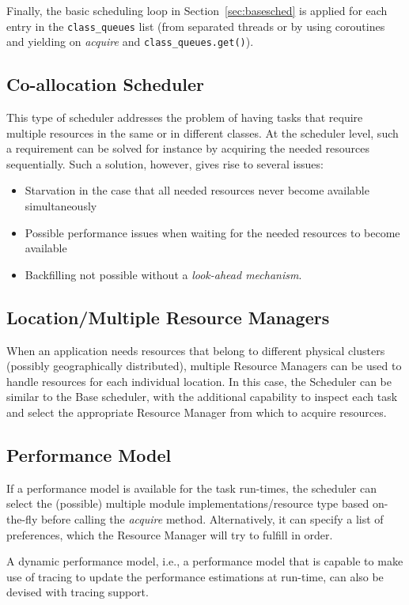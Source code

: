 \documentclass[10pt]{article}
\begin{document}
Finally, the basic scheduling loop in Section~\ref{sec:basesched} is applied 
for each entry in the \texttt{class\_queues} list (from separated threads or by using 
coroutines and yielding on \emph{acquire} and \texttt{class\_queues.get()}).


\subsection{Co-allocation Scheduler}
This type of scheduler addresses the problem of having tasks that require
multiple resources in the same or in different classes. 
At the scheduler level, such a requirement can be solved for instance by
acquiring the needed resources sequentially.
Such a solution, however, gives rise to several issues:
\begin{itemize}
    \item Starvation in the case that all needed resources never become
    available simultaneously
    \item Possible performance issues when waiting for the needed resources to
    become available
    \item Backfilling not possible without a \emph{look-ahead mechanism}.
\end{itemize}

\subsection{Location/Multiple Resource Managers}
\label{sec:localtionsched}
When an application needs resources that belong to different physical clusters
(possibly geographically distributed), multiple Resource Managers can be used to
handle resources for each individual location.
In this case, the Scheduler can be similar to the Base scheduler, with the
additional capability to inspect each task and select the appropriate Resource
Manager from which to acquire resources. 

\subsection{Performance Model}
If a performance model is available for the task run-times, the scheduler can
select the (possible) multiple module implementations/resource type based
on-the-fly before calling the \emph{acquire} method. 
Alternatively, it can specify a list of preferences, which the Resource Manager
will try to fulfill in order. 

A dynamic performance model, i.e., a performance model that is capable to make
use of tracing to update the performance estimations at run-time, can also be
devised with tracing support. 
\end{document}
